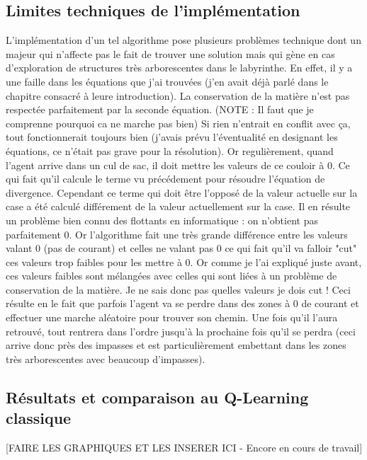 \documentclass[12pt]{article}
\begin{document}
\subsection{Limites techniques de l'implémentation}
L'implémentation d'un tel algorithme pose plusieurs problèmes technique dont un majeur qui n'affecte pas le fait de trouver une solution mais qui gène en cas d'exploration de structures très arborescentes dans le labyrinthe. En effet, il y a une faille dans les équations que j'ai trouvées (j'en avait déjà parlé dans le chapitre consacré à leure introduction). La conservation de la matière n'est pas respectée parfaitement par la seconde équation. (NOTE : Il faut que je comprenne pourquoi ca ne marche pas bien) Si rien n'entrait en conflit avec ça, tout fonctionnerait toujours bien (j'avais prévu l'éventualité en designant les équations, ce n'était pas grave pour la résolution). Or regulièrement, quand l'agent arrive dans un cul de sac, il doit mettre les valeurs de ce couloir à 0. Ce qui fait qu'il calcule le terme vu précédement pour résoudre l'équation de divergence. Cependant ce terme qui doit être l'opposé de la valeur actuelle sur la case a été calculé différement de la valeur actuellement sur la case. Il en résulte un problème bien connu des flottants en informatique : on n'obtient pas parfaitement 0. Or l'algorithme fait une très grande différence entre les valeurs valant 0 (pas de courant) et celles ne valant pas 0 ce qui fait qu'il va falloir "cut" ces valeurs trop faibles pour les mettre à 0. Or comme je l'ai expliqué juste avant, ces valeurs faibles sont mélangées avec celles qui sont liées à un problème de conservation de la matière. Je ne sais donc pas quelles valeurs je dois cut ! Ceci résulte en le fait que parfois l'agent va se perdre dans des zones à 0 de courant et effectuer une marche aléatoire pour trouver son chemin. Une fois qu'il l'aura retrouvé, tout rentrera dans l'ordre jusqu'à la prochaine fois qu'il se perdra (ceci arrive donc près des impasses et est particulièrement embettant dans les zones très arborescentes avec beaucoup d'impasses).

\subsection{Résultats et comparaison au Q-Learning classique}
[FAIRE LES GRAPHIQUES ET LES INSERER ICI - Encore en cours de travail]
\end{document}
